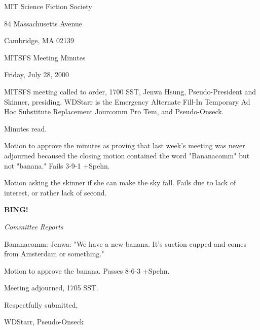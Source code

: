 \documentclass[12pt]{article}
\newcommand{\bing}{{\bf BING!} }
\newcommand{\goto}[1]{\bing \vskip 12pt \centerline{{\em{#1}}}}
\begin{document}
\begin{center}

MIT Science Fiction Society 

84 Massachusetts Avenue

Cambridge, MA 02139

\vspace{12pt}

MITSFS Meeting Minutes 

Friday, July 28, 2000

\end{center}
 
\vspace{18pt}

\setlength{\parskip}{6pt}

\noindent
MITSFS meeting called to order, 1700 SST, Jenwa Hsung, Pseudo-President and
Skinner, presiding. WDStarr is the Emergency Alternate Fill-In Temporary Ad Hoc Substitute Replacement Jourcomm Pro Tem, and Pseudo-Onseck.

Minutes read.

Motion to approve the minutes as proving that last week's meeting was never adjourned becaused the closing motion contained the word "Bananacomm" but not "banana." Fails 3-9-1 +Spehn.

Motion asking the skinner if she can make the sky fall. Fails due to lack of interest, or rather lack of second.

\goto{Committee Reports}

Bananacomm: Jenwa: "We have a new banana. It's suction cupped and comes from Amsterdam or something."

Motion to approve the banana. Passes 8-6-3 +Spehn.

\vspace{12pt}

\noindent
Meeting adjourned, 1705 SST.

\vspace{18pt}

\centerline{Respectfully submitted,}
\centerline{WDStarr, Pseudo-Onseck}
\end{document}
